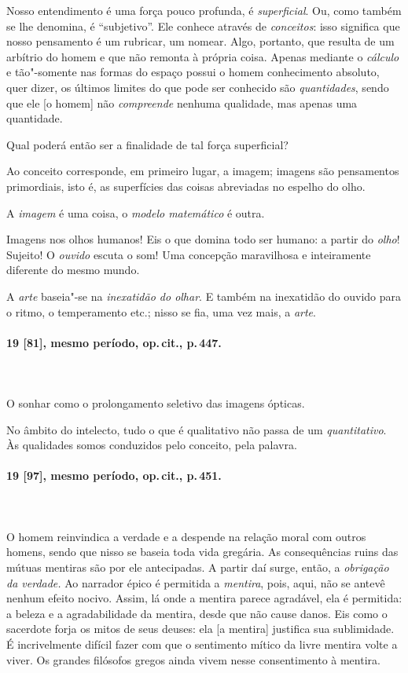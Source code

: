 Nosso entendimento é uma força pouco profunda, é \textit{superficial}.
Ou, como também se lhe denomina, é “subjetivo”. Ele conhece através de
\textit{conceitos}: isso significa que nosso pensamento é um rubricar,
um nomear. Algo, portanto, que resulta de um arbítrio do homem e que
não remonta à própria coisa. Apenas mediante o \textit{cálculo} e
tão"-somente nas formas do espaço possui o homem conhecimento absoluto,
quer dizer, os últimos limites do que pode ser conhecido são
\textit{quantidades}, sendo que ele [o homem] não \textit{compreende}
nenhuma qualidade, mas apenas uma quantidade. 

Qual poderá então ser a finalidade de tal força superficial? 

Ao conceito corresponde, em primeiro lugar, a imagem; imagens são
pensamentos primordiais, isto é, as superfícies das coisas abreviadas
no espelho do olho.

A \textit{imagem} é uma coisa, o \textit{modelo matemático} é outra.

Imagens nos olhos humanos! Eis o que domina todo ser humano: a partir do
\textit{olho}! Sujeito! O \textit{ouvido} escuta o som! Uma concepção
maravilhosa e inteiramente diferente do mesmo mundo.

A \textit{arte} baseia"-se na \textit{inexatidão do olhar}. E também na
inexatidão do ouvido para o ritmo, o temperamento etc.; nisso se fia,
uma vez mais, a \textit{arte}. 

\pagebreak
\paragraph*{19 [81], mesmo período, op.\,cit., p.\,447.}
\ \\
\ \\

O sonhar como o prolongamento seletivo das imagens ópticas.

No âmbito do intelecto, tudo o que é qualitativo não passa de um
\textit{quantitativo}. Às qualidades somos conduzidos pelo conceito,
pela palavra.

\pagebreak
\paragraph*{19 [97], mesmo período, op.\,cit., p.\,451.}
\ \\
\ \\

O homem reinvindica a verdade e a despende na relação moral com outros
homens, sendo que nisso se baseia toda vida gregária. As consequências
ruins das mútuas mentiras são por ele antecipadas. A partir daí surge,
então, a \textit{obrigação da verdade.} Ao narrador épico é permitida a
\textit{mentira}, pois, aqui, não se antevê nenhum efeito nocivo. 
Assim, lá onde a mentira parece agradável, ela é permitida: a beleza e
a agradabilidade da mentira, desde que não cause danos. Eis como o
sacerdote forja os mitos de seus deuses: ela [a mentira] justifica sua
sublimidade. É incrivelmente difícil fazer com que o sentimento mítico
da livre mentira volte a viver. Os grandes filósofos gregos ainda vivem
nesse consentimento à mentira.

